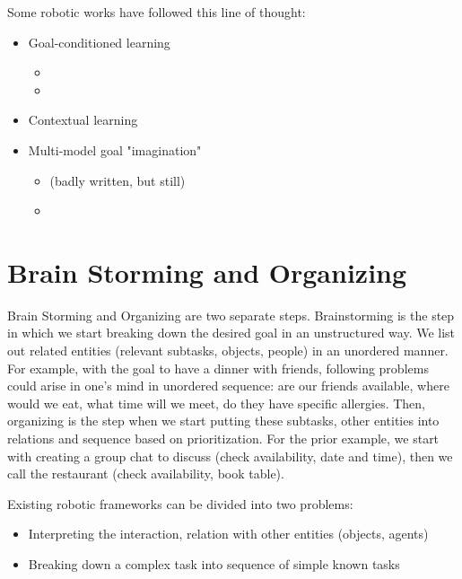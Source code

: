 Some robotic works have followed this line of thought:
\begin{itemize}
	\item Goal-conditioned learning
	\begin{itemize}		
		\item {}
		\item {}
	\end{itemize}
	\item Contextual learning \todo{}
	\item Multi-model goal "imagination"
	\begin{itemize}
		\item {} (badly written, but still)
		\item \todo{}
	\end{itemize}
\end{itemize}

\section{Brain Storming and Organizing}
Brain Storming and Organizing are two separate steps. Brainstorming is the step in which we start breaking down the desired goal in an unstructured way. We list out related entities (relevant subtasks, objects, people) in an unordered manner. For example, with the goal to have a dinner with friends, following problems could arise in one's mind in unordered sequence: are our friends available, where would we eat, what time will we meet, do they have specific allergies. Then, organizing is the step when we start putting these subtasks, other entities into relations and sequence based on prioritization. For the prior example, we start with creating a group chat to discuss (check availability, date and time), then we call the restaurant (check availability, book table).

Existing robotic frameworks can be divided into two problems:
\begin{itemize}
	\item Interpreting the interaction, relation with other entities (objects, agents)
	\item Breaking down a complex task into sequence of simple known tasks
\end{itemize}

